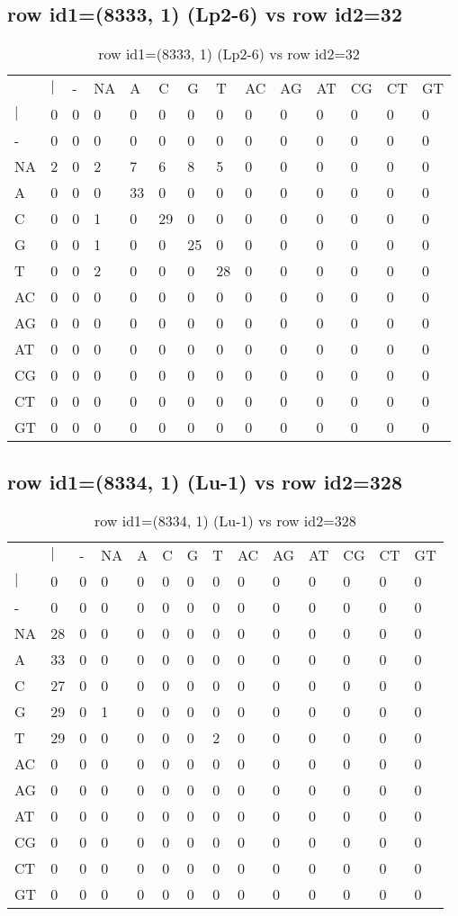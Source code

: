 \subsection{row id1=(8333, 1) (Lp2-6) vs row id2=32}
\begin{center}
\begin{longtable}{|l|l|l|l|l|l|l|l|l|l|l|l|l|l|}
\caption{row id1=(8333, 1) (Lp2-6) vs row id2=32} \label{table_dm338}\\
\hline
\\
\hline
&$|$&-&NA&A&C&G&T&AC&AG&AT&CG&CT&GT\\
$|$&0&0&0&0&0&0&0&0&0&0&0&0&0\\
-&0&0&0&0&0&0&0&0&0&0&0&0&0\\
NA&2&0&2&7&6&8&5&0&0&0&0&0&0\\
A&0&0&0&33&0&0&0&0&0&0&0&0&0\\
C&0&0&1&0&29&0&0&0&0&0&0&0&0\\
G&0&0&1&0&0&25&0&0&0&0&0&0&0\\
T&0&0&2&0&0&0&28&0&0&0&0&0&0\\
AC&0&0&0&0&0&0&0&0&0&0&0&0&0\\
AG&0&0&0&0&0&0&0&0&0&0&0&0&0\\
AT&0&0&0&0&0&0&0&0&0&0&0&0&0\\
CG&0&0&0&0&0&0&0&0&0&0&0&0&0\\
CT&0&0&0&0&0&0&0&0&0&0&0&0&0\\
GT&0&0&0&0&0&0&0&0&0&0&0&0&0\\
\hline
\end{longtable}
\end{center}

\subsection{row id1=(8334, 1) (Lu-1) vs row id2=328}
\begin{center}
\begin{longtable}{|l|l|l|l|l|l|l|l|l|l|l|l|l|l|}
\caption{row id1=(8334, 1) (Lu-1) vs row id2=328} \label{table_dm340}\\
\hline
\\
\hline
&$|$&-&NA&A&C&G&T&AC&AG&AT&CG&CT&GT\\
$|$&0&0&0&0&0&0&0&0&0&0&0&0&0\\
-&0&0&0&0&0&0&0&0&0&0&0&0&0\\
NA&28&0&0&0&0&0&0&0&0&0&0&0&0\\
A&33&0&0&0&0&0&0&0&0&0&0&0&0\\
C&27&0&0&0&0&0&0&0&0&0&0&0&0\\
G&29&0&1&0&0&0&0&0&0&0&0&0&0\\
T&29&0&0&0&0&0&2&0&0&0&0&0&0\\
AC&0&0&0&0&0&0&0&0&0&0&0&0&0\\
AG&0&0&0&0&0&0&0&0&0&0&0&0&0\\
AT&0&0&0&0&0&0&0&0&0&0&0&0&0\\
CG&0&0&0&0&0&0&0&0&0&0&0&0&0\\
CT&0&0&0&0&0&0&0&0&0&0&0&0&0\\
GT&0&0&0&0&0&0&0&0&0&0&0&0&0\\
\hline
\end{longtable}
\end{center}

